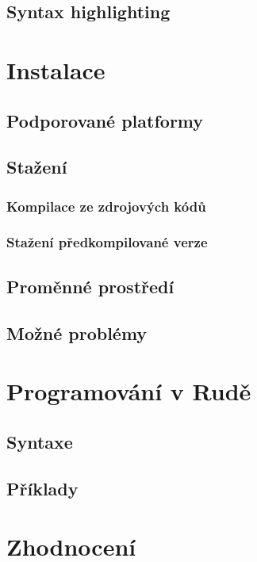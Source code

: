 \documentclass[12pt, a4paper,
twoside,        %
openright
]{report}
\let\oldchapter\chapter
\renewcommand{\chapter}{
	\clearpage
	\pagestyle{fancy}
	\oldchapter
}
\begin{document}
\section{Syntax highlighting}

\chapter{Instalace}

\section{Podporované platformy}

\section{Stažení}

\subsection{Kompilace ze zdrojových kódů}

\subsection{Stažení předkompilované verze}

\section{Proměnné prostředí}

\section{Možné problémy}

\chapter{Programování v Rudě}

\section{Syntaxe}

\section{Příklady}

\chapter{Zhodnocení}
\end{document}
